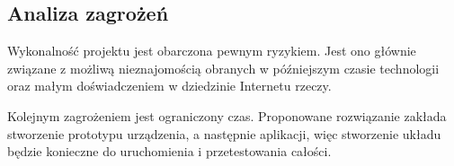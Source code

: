 \subsection{Analiza zagrożeń}
Wykonalność projektu jest obarczona pewnym ryzykiem. Jest ono głównie związane z możliwą nieznajomością obranych w późniejszym czasie technologii oraz małym doświadczeniem w dziedzinie Internetu rzeczy.

Kolejnym zagrożeniem jest ograniczony czas. Proponowane rozwiązanie zakłada stworzenie prototypu urządzenia, a następnie aplikacji, więc stworzenie układu będzie konieczne do uruchomienia i przetestowania całości.
